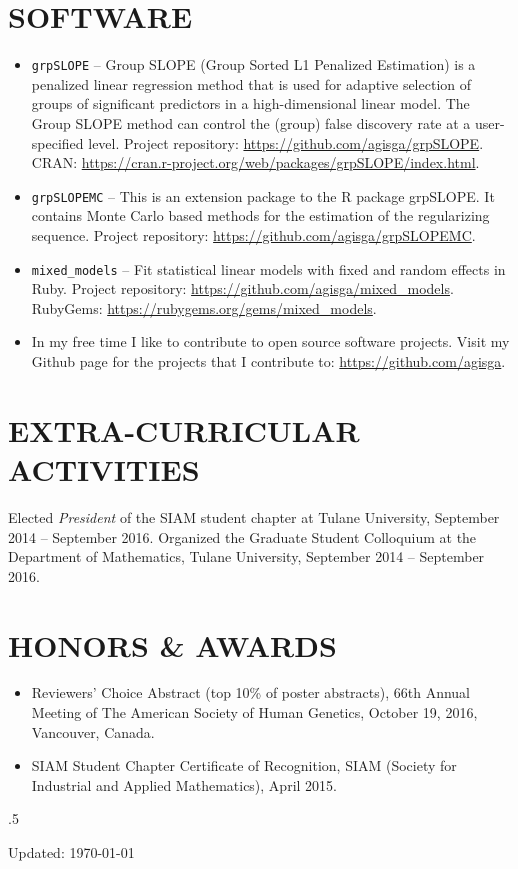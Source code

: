 \documentclass[margin]{res} %
\begin{document}
\begin{resume}

\section{SOFTWARE}

\begin{itemize} \itemsep -2pt %
    \item \verb!grpSLOPE! -- Group SLOPE (Group Sorted L1 Penalized Estimation) is a penalized linear regression method that is used for adaptive selection of groups of significant predictors in a high-dimensional linear model. The Group SLOPE method can control the (group) false discovery rate at a user-specified level. Project repository: \url{https://github.com/agisga/grpSLOPE}. CRAN: \url{https://cran.r-project.org/web/packages/grpSLOPE/index.html}.
    \item \verb!grpSLOPEMC! -- This is an extension package to the R package grpSLOPE. It contains Monte Carlo based methods for the estimation of the regularizing sequence. Project repository: \url{https://github.com/agisga/grpSLOPEMC}.
    \item \verb!mixed_models! -- Fit statistical linear models with fixed and random effects in Ruby. Project repository: \url{https://github.com/agisga/mixed_models}. RubyGems: \url{https://rubygems.org/gems/mixed_models}.
    \item In my free time I like to contribute to open source software projects. Visit my Github page for the projects that I contribute to: \url{https://github.com/agisga}.
\end{itemize}


\section{EXTRA-CURRICULAR \\ ACTIVITIES}

Elected {\it President} of the SIAM student chapter at Tulane University, September 2014 -- September 2016.
Organized the Graduate Student Colloquium at the Department of Mathematics, Tulane University, September 2014 -- September 2016.


\section{HONORS \& AWARDS}

\begin{itemize}
  \item Reviewers’ Choice Abstract (top 10\% of poster abstracts), 66th Annual Meeting of The American Society of Human Genetics, October 19, 2016, Vancouver, Canada.
  \item SIAM Student Chapter Certificate of Recognition, SIAM (Society for Industrial and Applied Mathematics), April 2015.
\end{itemize}

\vfill
\moveleft.5\hoffset\centerline{Updated: \today}


\end{resume}
\end{document}
